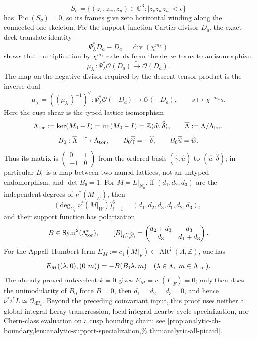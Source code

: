 \begin{enumerate}[leftmargin=1.8em]
\[
 S_\sigma=\{(z_v,z_w,z_u)\in\mathbb C^3:
               |z_vz_wz_u|<\epsilon\}
\]
has \(\operatorname{Pic}(S_\sigma)=0\), so its frames give zero horizontal
winding along the connected one-skeleton.  For the support-function Cartier
divisor \(D_a\), the exact deck-translate identity
\[
 \Psi_\lambda^*D_a-D_a=\operatorname{div}(\chi^{m_\lambda})
\]
shows that multiplication by \(\chi^{m_\lambda}\) extends from the dense
torus to an isomorphism
\[
 \mu^+_\lambda:\Psi_\lambda^*\mathcal O(D_a)
 \xrightarrow{\ \sim\ }\mathcal O(D_a).
\]
The map on the negative divisor required by the descent tensor product is
the inverse-dual
\[
 \mu^-_\lambda=((\mu^+_\lambda)^{-1})^\vee:
 \Psi_\lambda^*\mathcal O(-D_a)\longrightarrow\mathcal O(-D_a),\qquad
 s\longmapsto\chi^{-m_\lambda}s.
\]
Here the cusp shear is the typed lattice isomorphism
\[
 \Lambda_{\rm tor}:=\ker(M_0-I)=\operatorname{im}(M_0-I)
   =\mathbb Z\langle\widehat w,\widehat\delta\rangle,
 \qquad \overline\Lambda:=\Lambda/\Lambda_{\rm tor},
\]
\[
 B_0:\overline\Lambda\xrightarrow{\ \sim\ }\Lambda_{\rm tor},
 \qquad
 B_0\overline{\widehat\gamma}=-\widehat\delta,
 \qquad B_0\overline{\widehat u}=\widehat w.
\]
Thus its matrix is
\(\left(\begin{smallmatrix}0&1\\-1&0\end{smallmatrix}\right)\)
from the ordered basis
\((\overline{\widehat\gamma},\overline{\widehat u})\) to
\((\widehat w,\widehat\delta)\); in particular \(B_0\) is a map between
two named lattices, not an untyped endomorphism, and \(\det B_0=1\).
For \(M=L|_{N_0}\), if \((d_1,d_2,d_3)\) are the independent degrees of
\(\nu^*(M|_W)\), then
\[
 \bigl(\deg_{C_i}\nu^*(M|_W)\bigr)_{i=1}^6
 =(d_1,d_2,d_3,d_1,d_2,d_3),
\]
and their support function has polarization
\[
 B\in\operatorname{Sym}^2(\Lambda_{\rm tor}^*),\qquad
 [B]_{(\widehat w,\widehat\delta)}
 =\begin{pmatrix}d_2+d_3&d_3\\d_3&d_1+d_3\end{pmatrix}.
\]
For the Appell--Humbert form
\(E_M:=c_1(M|_F)\in\operatorname{Alt}^2(\Lambda,\mathbb Z)\), one has
\[
 E_M((\lambda,0),(0,m))=-B(B_0\lambda,m)
 \quad
 (\lambda\in\overline\Lambda,\ m\in\Lambda_{\rm tor}).
\]
The already proved antecedent \(k=0\) gives
\(E_M=c_1(L|_F)=0\); only then does the unimodularity of \(B_0\)
force \(B=0\), then \(d_1=d_2=d_3=0\), and hence
\(\nu^*i^*L\simeq\mathcal O_{\mathrm{dP}_6}\).  Beyond the preceding
coinvariant input, this proof uses neither a global integral Leray
transgression, local integral nearby-cycle specialization, nor Chern-class
evaluation on a cusp bounding chain; see
\cref{prop:analytic-ah-boundary,lem:analytic-support-specialization,%
thm:analytic-all-picard}.


\end{enumerate}

